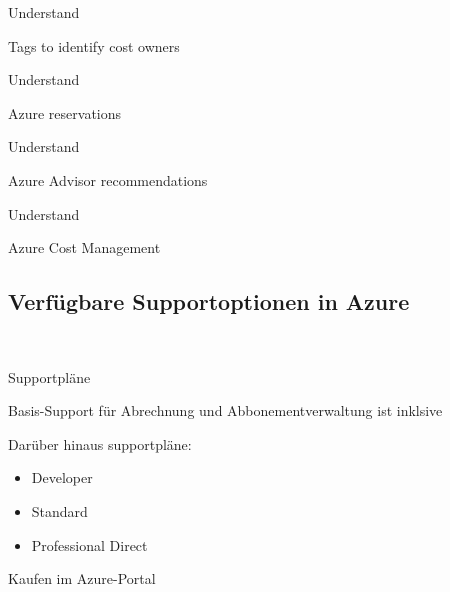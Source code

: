 \documentclass{scrartcl}
\newenvironment{flashcard}[2][]{%
    #1
    \vfill
    \centerline{\Large{#2}}
    \vfill
\newpage
}
{\newpage}
\newcommand{\subsectioncard}[1]{
    \vspace*{\stretch{1}}
    \subsection{#1}
    \vspace*{\stretch{1}}
    \pagebreak
}
\begin{document}
    \begin{flashcard}[Understand]{Tags to identify cost owners}

    \end{flashcard}

    \begin{flashcard}[Understand]{Azure reservations}

    \end{flashcard}

    \begin{flashcard}[Understand]{Azure Advisor recommendations}

    \end{flashcard}

    \begin{flashcard}[Understand]{Azure Cost Management}

    \end{flashcard}

    \subsectioncard{Verfügbare Supportoptionen in Azure}

    \begin{flashcard}[\ ]{Supportpläne}
        Basis-Support für Abrechnung und Abbonementverwaltung ist inklsive

        \vspace{5mm}
        Darüber hinaus supportpläne:
        \begin{itemize}
            \item Developer
            \item Standard
            \item Professional Direct
        \end{itemize}

        \vspace{5mm}
        Kaufen im Azure-Portal
    \end{flashcard}
\end{document}
